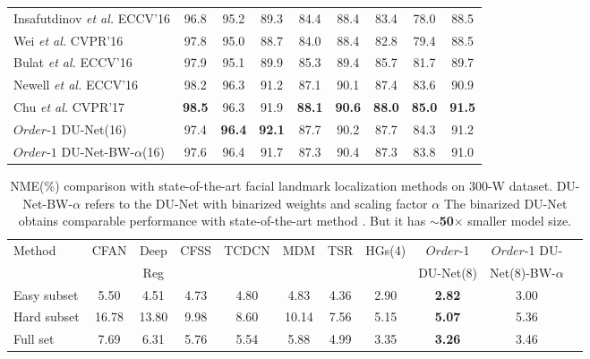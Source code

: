 \documentclass[runningheads]{llncs}
\begin{document}
\begin{table}[t!]
\begin{center}
\begin{tabular}{@{}lcccccccc@{}}
Insafutdinov \textit{et al.} ECCV'16 \cite{insafutdinov2016deepercut}&96.8 & 95.2 & 89.3 & 84.4 & 88.4 & 83.4 & 78.0 & 88.5\\
Wei \textit{et al.} CVPR'16 \cite{wei2016convolutional} & 97.8 & 95.0 & 88.7 & 84.0 & 88.4 & 82.8 & 79.4 & 88.5\\
Bulat \textit{et al.} ECCV'16 \cite{bulat2016human} & 97.9 & 95.1 & 89.9 & 85.3 & 89.4 & 85.7 & 81.7 & 89.7\\
Newell {\it et al.}  ECCV'16 \cite{newell2016stacked} & 98.2 & 96.3 & 91.2 & 87.1 & 90.1 & 87.4 & 83.6 & 90.9\\
Chu \textit{et al.} CVPR'17 \cite{chu2017multi} & {\bf 98.5} & 96.3 & 91.9 & {\bf 88.1} & {\bf 90.6} & {\bf 88.0} & {\bf 85.0} & {\bf 91.5}\\
\hline
$Order$-$1$ DU-Net(16) & 97.4  & {\bf 96.4}  & {\bf 92.1}  & 87.7  & 90.2  & 87.7 & 84.3 & 91.2\\
$Order$-$1$ DU-Net-BW-$\alpha$(16) & 97.6  & 96.4  & 91.7  & 87.3  & 90.4  & 87.3 & 83.8 & 91.0\\
\bottomrule
\end{tabular}
\end{center}
\end{table}

\begin{table}[t]
\begin{center}
\caption{NME(\%) comparison with state-of-the-art facial landmark localization methods on 300-W dataset. DU-Net-BW-$\alpha$ refers to the DU-Net with binarized weights and scaling factor $\alpha$ The binarized DU-Net obtains comparable performance with state-of-the-art method \cite{newell2016stacked}. But it has $\sim${\bf 50}$\times$ smaller model size.}\label{tb:300w}
\small
\setlength\tabcolsep{0.5pt}
\begin{tabular}{lccccccc|ccc}
\toprule
\multirow{2}{*}{Method} & CFAN  & Deep  & CFSS  
& TCDCN  & MDM  & TSR & HGs(4) & $Order$-1 & $Order$-1 DU-\\
& \cite{zhang2014coarse} & Reg \cite{shi2014deep} & \cite{zhu2015face} & \cite{zhang2014facial} &  \cite{trigeorgis2016mnemonic} & \cite{lv2017deep} & \cite{newell2016stacked} & DU-Net(8)& Net(8)-BW-$\alpha$\\
\hline
Easy subset  & 5.50 & 4.51  &  4.73 & 4.80 & 4.83  & 4.36 & 2.90 & {\bf 2.82} & 3.00\\ 
Hard subset  & 16.78 &  13.80  & 9.98 & 8.60 & 10.14 &  7.56 & 5.15 &{\bf 5.07} & 5.36\\
Full set   & 7.69 & 6.31 & 5.76 & 5.54 & 5.88 & 4.99 & 3.35 & {\bf 3.26} & 3.46\\
\bottomrule
\end{tabular}
\end{center}
\end{table}
\end{document}
